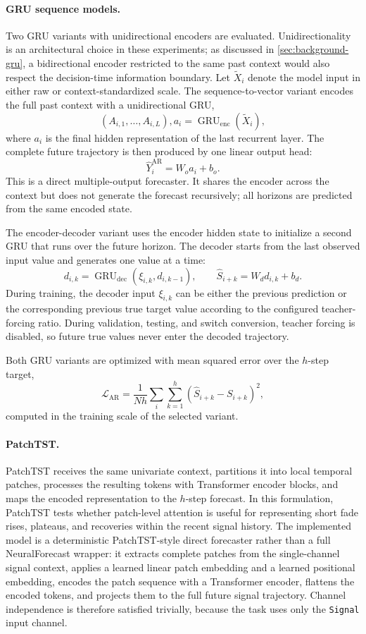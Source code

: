 \paragraph{GRU sequence models.}
Two GRU variants with unidirectional encoders are evaluated. Unidirectionality
is an architectural choice in these experiments; as discussed in
\cref{sec:background-gru}, a bidirectional encoder restricted to the same past
context would also respect the decision-time information boundary. Let
\(\widetilde{X}_i\) denote the model input in either raw or
context-standardized scale. The sequence-to-vector variant encodes the full
past context with a unidirectional GRU,
\[
  (A_{i,1},\ldots,A_{i,L}), a_i
  =
  \operatorname{GRU}_{\mathrm{enc}}(\widetilde{X}_i),
\]
where \(a_i\) is the final hidden representation of the last recurrent layer.
The complete future trajectory is then produced by one linear output head:
\[
  \widehat{Y}_i^{\text{AR}} = W_o a_i + b_o .
\]
This is a direct multiple-output forecaster. It shares the encoder across the
context but does not generate the forecast recursively; all horizons are
predicted from the same encoded state.

The encoder-decoder variant uses the encoder hidden state to initialize a second
GRU that runs over the future horizon. The decoder starts from the last observed
input value and generates one value at a time:
\[
  d_{i,k}
  =
  \operatorname{GRU}_{\mathrm{dec}}(\xi_{i,k},d_{i,k-1}),
  \qquad
  \widehat{S}_{i+k}=W_d d_{i,k}+b_d .
\]
During training, the decoder input \(\xi_{i,k}\) can be either the previous
prediction or the corresponding previous true target value according to the
configured teacher-forcing ratio. During validation, testing, and switch
conversion, teacher forcing is disabled, so future true values never enter the
decoded trajectory.

Both GRU variants are optimized with mean squared error over the \(h\)-step
target,
\[
  \mathcal{L}_{\mathrm{AR}}
  =
  \frac{1}{Nh}
  \sum_i\sum_{k=1}^{h}
  \left(\widehat{S}_{i+k}-S_{i+k}\right)^2 ,
\]
computed in the training scale of the selected variant.

\paragraph{PatchTST.}
PatchTST receives the same univariate context, partitions it into local temporal
patches, processes the resulting tokens with Transformer encoder blocks, and
maps the encoded representation to the \(h\)-step forecast. In this formulation,
PatchTST tests whether patch-level attention is useful for representing short
fade rises, plateaus, and recoveries within the recent signal history. The
implemented model is a deterministic PatchTST-style direct forecaster rather
than a full NeuralForecast wrapper: it extracts complete patches from the
single-channel signal context, applies a learned linear patch embedding and a
learned positional embedding, encodes the patch sequence with a Transformer
encoder, flattens the encoded tokens, and projects them to the full future
signal trajectory. Channel independence is therefore satisfied trivially,
because the task uses only the \texttt{Signal} input channel.

